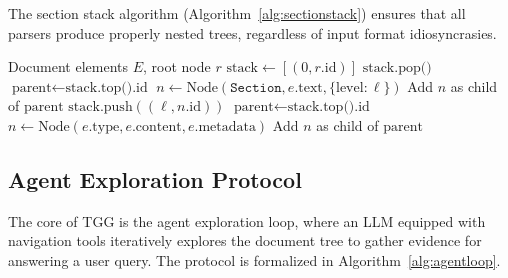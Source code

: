 \documentclass[conference]{IEEEtran}
\begin{document}
The section stack algorithm (Algorithm~\ref{alg:sectionstack}) ensures that all parsers produce properly nested trees, regardless of input format idiosyncrasies.

\begin{algorithm}[t]
\caption{Section Stack Nesting Algorithm}
\label{alg:sectionstack}
\begin{algorithmic}[1]
\REQUIRE Document elements $E$, root node $r$
\STATE $\text{stack} \leftarrow [(0, r.\text{id})]$
            \STATE $\text{stack.pop()}$
        \ENDWHILE
        \STATE $\text{parent} \leftarrow \text{stack.top().id}$
        \STATE $n \leftarrow \text{Node}(\texttt{Section}, e.\text{text}, \{\text{level}: \ell\})$
        \STATE Add $n$ as child of $\text{parent}$
        \STATE $\text{stack.push}((\ell, n.\text{id}))$
    \ELSE
        \STATE $\text{parent} \leftarrow \text{stack.top().id}$
        \STATE $n \leftarrow \text{Node}(e.\text{type}, e.\text{content}, e.\text{metadata})$
        \STATE Add $n$ as child of $\text{parent}$
    \ENDIF
\ENDFOR
\end{algorithmic}
\end{algorithm}

\subsection{Agent Exploration Protocol}

The core of TGG is the agent exploration loop, where an LLM equipped with navigation tools iteratively explores the document tree to gather evidence for answering a user query. The protocol is formalized in Algorithm~\ref{alg:agentloop}.
\end{document}

